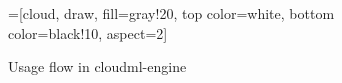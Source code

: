 \begin{figure}
  =[cloud, draw, fill=gray!20, top color=white, bottom color=black!10, aspect=2]

  \begin{center}
  \end{center}
  \caption{Usage flow in cloudml-engine}
  \label{fig:cloudml-engine}
\end{figure}
